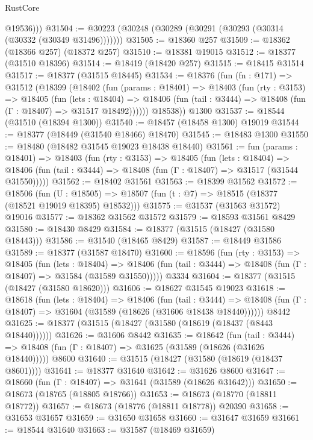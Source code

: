 \begin{lexlean}{RustCore}
\begin{coremodule}
          @19536)))
@31504 := @30223 (@30248 (@30289 (@30291 (@30293 (@30314 (@30332 (@30349 @31496)))))))
@31505 := @18360 @257
@31509 := @18362 (@18366 @257) (@18372 @257)
@31510 := @18381 @19015
@31512 := @18377 (@31510 @18396)
@31514 := @18419 (@18420 @257)
@31515 := @18415 @31514
@31517 := @18377 (@31515 @18445)
@31534 := @18376
    (fun (fn : @171) =>
    @31512
      (@18399
        (@18402
          (fun (params : @18401) =>
          @18403
            (fun (rty : @3153) =>
            @18405
              (fun (lets : @18404) =>
              @18406 (fun (tail : @3444) => @18408 (fun (Γ : @18407) => @31517 @18492))))))
        @18538))
    @1300
@31537 := @18544 (@31510 (@18394 @1300))
@31540 := @18457 (@18458 @1300) @19019
@31544 := @18377 (@18449 (@31540 @18466) @18470)
@31545 := @18483 @1300
@31550 := @18480 (@18482 @31545 @19023 @18438 @18440)
@31561 := fun (params : @18401) =>
  @18403
    (fun (rty : @3153) =>
    @18405
      (fun (lets : @18404) =>
      @18406 (fun (tail : @3444) => @18408 (fun (Γ : @18407) => @31517 (@31544 @31550)))))
@31562 := @18402 @31561
@31563 := @18399 @31562
@31572 := @18506
    (fun (U : @18505) => @18507 (fun (t : @7) => @18515 (@18377 (@18521 @19019 @18395) @18532)))
@31575 := @31537 (@31563 @31572) @19016
@31577 := @18362 @31562 @31572
@31579 := @18593 @31561 @8429
@31580 := @18430 @8429
@31584 := @18377 (@31515 (@18427 (@31580 @18443)))
@31586 := @31540 (@18465 @8429)
@31587 := @18449 @31586
@31589 := @18377 (@31587 @18470)
@31600 := @18596
    (fun (rty : @3153) =>
    @18405
      (fun (lets : @18404) =>
      @18406 (fun (tail : @3444) => @18408 (fun (Γ : @18407) => @31584 (@31589 @31550)))))
    @3334
@31604 := @18377 (@31515 (@18427 (@31580 @18620)))
@31606 := @18627 @31545 @19023
@31618 := @18618
    (fun (lets : @18404) =>
    @18406
      (fun (tail : @3444) =>
      @18408 (fun (Γ : @18407) => @31604 (@31589 (@18626 (@31606 @18438 @18440))))))
    @8442
@31625 := @18377 (@31515 (@18427 (@31580 (@18619 (@18437 (@8443 @18440))))))
@31626 := @31606 @8442
@31635 := @18642
    (fun (tail : @3444) => @18408 (fun (Γ : @18407) => @31625 (@31589 (@18626 (@31626 @18440)))))
    @8600
@31640 := @31515 (@18427 (@31580 (@18619 (@18437 @8601))))
@31641 := @18377 @31640
@31642 := @31626 @8600
@31647 := @18660 (fun (Γ : @18407) => @31641 (@31589 (@18626 @31642)))
@31650 := @18673 (@18765 (@18805 @18766))
@31653 := @18673 (@18770 (@18811 @18772))
@31657 := @18673 (@18776 (@18811 @18778)) @20390
@31658 := @31653 @31657
@31659 := @31650 @31658
@31660 := @31647 @31659
@31661 := @18544 @31640
@31663 := @31587 (@18469 @31659)

\end{coremodule}
\end{lexlean}
